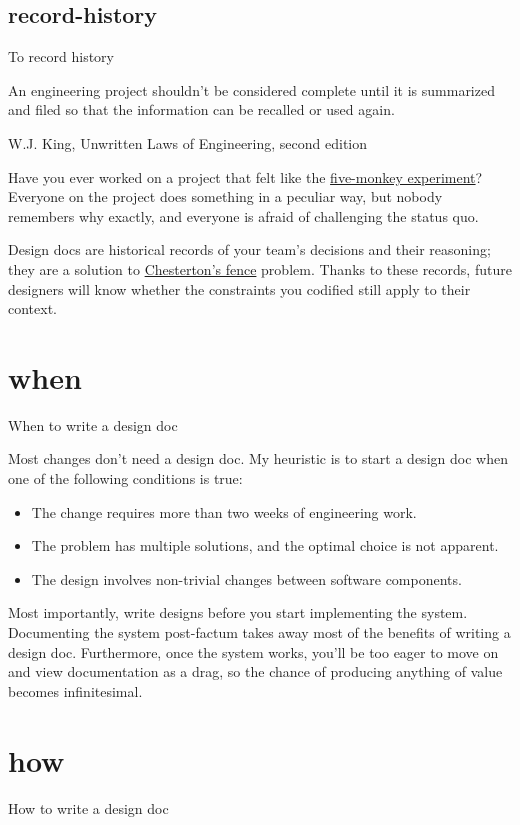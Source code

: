 \documentclass{article}
\begin{document}
\subsection{record-history}{To record history}
\epigraph{
An engineering project shouldn't be considered complete until it is summarized and filed so that the information can be recalled or used again.  
}{W.J. King, Unwritten Laws of Engineering, second edition}

Have you ever worked on a project that felt like the \href{https://skeptics.stackexchange.com/questions/6828/was-the-experiment-with-five-monkeys-a-ladder-a-banana-and-a-water-spray-condu#6859}{five-monkey experiment}?
Everyone on the project does something in a peculiar way, but nobody remembers why exactly, and everyone is afraid of challenging the status quo.

Design docs are historical records of your team's decisions and their reasoning; they are a solution to \href{https://fs.blog/chestertons-fence/}{Chesterton's fence} problem.
Thanks to these records, future designers will know whether the constraints you codified still apply to their context.

\section{when}{When to write a design doc}

Most changes don't need a design doc.
My heuristic is to start a design doc when one of the following conditions is true:
\begin{itemize}
\item The change requires more than two weeks of engineering work.
\item The problem has multiple solutions, and the optimal choice is not apparent.
\item The design involves non-trivial changes between software components.
\end{itemize}

Most importantly, write designs before you start implementing the system.
Documenting the system post-factum takes away most of the benefits of writing a design doc.
Furthermore, once the system works, you'll be too eager to move on and view documentation as a drag, so the chance of producing anything of value becomes infinitesimal.

\section{how}{How to write a design doc}
\end{document}
